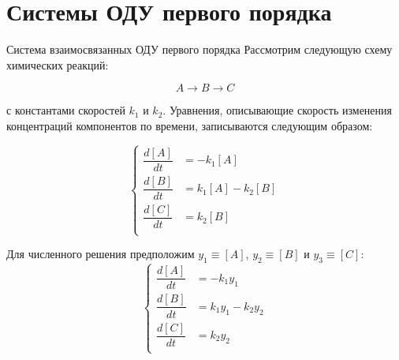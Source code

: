 \documentclass[aspectratio=169, mathserif]{beamer}%
\begin{document}
\section{Системы ОДУ первого порядка}
\begin{frame}[fragile]{Система взаимосвязанных ОДУ первого порядка}
\scriptsize
Рассмотрим следующую схему химических реакций:

$$A \rightarrow B \rightarrow C$$

\noindent с константами скоростей $k_1$ и $k_2$. Уравнения, описывающие скорость изменения концентраций компонентов по времени, записываются следующим образом:

\begin{equation*}
	\left\{
	\begin{aligned}
		\dfrac{d\left[A\right]}{dt} &= -k_1\left[A\right] \\
		\dfrac{d\left[B\right]}{dt} &=  k_1\left[A\right] - k_2\left[B\right] \\
		\dfrac{d\left[C\right]}{dt} &=  k_2\left[B\right] \\
	\end{aligned}
	\right.
\end{equation*}


Для численного решения предположим $y_1 \equiv \left[A\right]$,  $y_2 \equiv \left[B\right]$ и $y_3 \equiv \left[C\right]$:
\begin{equation*}
	\left\{
	\begin{aligned}
		\dfrac{d\left[A\right]}{dt} &= -k_1y_1 \\
		\dfrac{d\left[B\right]}{dt} &=  k_1y_1 - k_2y_2 \\
		\dfrac{d\left[C\right]}{dt} &=  k_2y_2 \\
	\end{aligned}
	\right.
\end{equation*}
\vfill
\end{frame}
\end{document}
